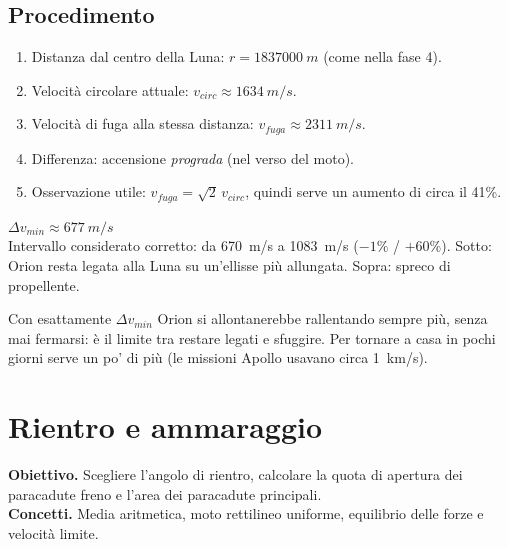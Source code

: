 \documentclass[11pt,a4paper]{article}
\newcommand{\fasenuova}{\clearpage}
\newcommand{\dv}{\Delta v}
\begin{document}
\subsection{Procedimento}
\begin{enumerate}
  \item Distanza dal centro della Luna: $r = \SI{1837000}{m}$ (come nella fase 4).
  \item Velocità circolare attuale: $v_{circ} \approx \SI{1634}{m/s}$.
  \item Velocità di fuga alla stessa distanza: $v_{fuga} \approx \SI{2311}{m/s}$.
  \item Differenza: accensione \emph{prograda} (nel verso del moto).
  \item Osservazione utile: $v_{fuga} = \sqrt2\,v_{circ}$, quindi serve un aumento di circa il 41\%.
\end{enumerate}

\begin{risultato}
$\dv_{min} \approx \SI{677}{m/s}$\\[0.2em]
{\small Intervallo considerato corretto: da \SI{670}{m/s} a \SI{1083}{m/s} ($-1\%$ / $+60\%$).
Sotto: Orion resta legata alla Luna su un'ellisse più allungata. Sopra: spreco di propellente.}
\end{risultato}

\begin{modello}
Con esattamente $\dv_{min}$ Orion si allontanerebbe rallentando sempre più, senza mai fermarsi: è il limite tra
restare legati e sfuggire. Per tornare a casa in pochi giorni serve un po' di più (le missioni Apollo usavano circa
\SI{1}{km/s}).
\end{modello}

\fasenuova
\section{Rientro e ammaraggio}

\textbf{Obiettivo.} Scegliere l'angolo di rientro, calcolare la quota di apertura dei paracadute freno e l'area
dei paracadute principali.\\
\textbf{Concetti.} Media aritmetica, moto rettilineo uniforme, equilibrio delle forze e velocità limite.
\end{document}
